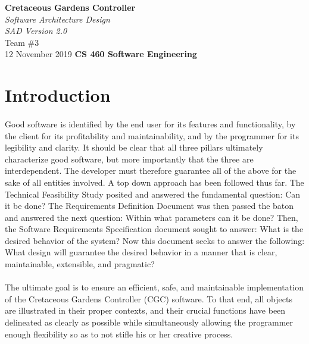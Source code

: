 \documentclass[12pt]{article}
\begin{document}
\begin{titlepage}
    \begin{flushleft}
        \vspace{1cm} \Huge  \textbf{Cretaceous Gardens Controller}\\
        \vspace{1cm} \Huge  \textit{Software Architecture Design}\\
        \vspace{1cm} \Large \textit{SAD Version 2.0}\\
        \vspace{5cm} \LARGE         Team \#3\\ 
                                    12 November 2019
        \vfill       \Huge  \textbf{CS 460 Software Engineering}
    \end{flushleft}
\end{titlepage}
\normalsize 
\tableofcontents
\pagebreak

\section{Introduction} \label{intro}
\paragraph{} Good software is identified by the end user for its features and functionality, by the client
for its profitability and maintainability, and by the programmer for its legibility and clarity. It should be clear
that all three pillars ultimately characterize good software, but more importantly that the three are interdependent.
The developer must therefore guarantee all of the above for the sake of all entities involved. A top down approach has been
followed thus far. The Technical Feasibility Study posited and answered the fundamental question: Can it be done? The Requirements
Definition Document was then passed the baton and answered the next question: Within what parameters can it be done? Then, 
the Software Requirements Specification document sought to answer: What is the desired behavior of the system? Now this document 
seeks to answer the following: What design will guarantee the desired behavior in a manner that is clear, maintainable, extensible, 
and pragmatic?

\paragraph{} The ultimate goal is to ensure an efficient, safe, and maintainable implementation of the Cretaceous Gardens Controller 
(CGC) software. To that end, all objects are illustrated in their proper contexts, and their crucial 
functions have been delineated as clearly as possible while simultaneously allowing the programmer enough flexibility so 
as to not stifle his or her creative process. 
\end{document}

